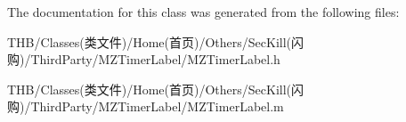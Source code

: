 The documentation for this class was generated from the following files\+:\begin{DoxyCompactItemize}
\item 
T\+H\+B/\+Classes(类文件)/\+Home(首页)/\+Others/\+Sec\+Kill(闪购)/\+Third\+Party/\+M\+Z\+Timer\+Label/M\+Z\+Timer\+Label.\+h\item 
T\+H\+B/\+Classes(类文件)/\+Home(首页)/\+Others/\+Sec\+Kill(闪购)/\+Third\+Party/\+M\+Z\+Timer\+Label/M\+Z\+Timer\+Label.\+m\end{DoxyCompactItemize}
